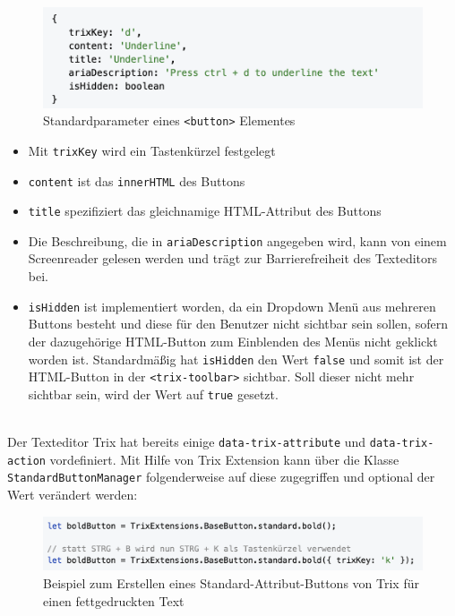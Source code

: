 \begin{figure}[H]
\begin{center}
	\includegraphics[scale=.7]{images/base-button.png}
\end{center}
	\caption{Standardparameter eines \texttt{<button>} Elementes}
\end{figure}

\begin{itemize}
	\item Mit \texttt{trixKey} wird ein Tastenkürzel festgelegt 
	\item \texttt{content} ist das \texttt{innerHTML} des Buttons
	\item \texttt{title} spezifiziert das gleichnamige HTML-Attribut des Buttons
	\item Die Beschreibung, die in \texttt{ariaDescription} angegeben wird, kann von einem Screenreader gelesen 
		werden und 
		trägt zur Barrierefreiheit des Texteditors bei.
	\item \texttt{isHidden} ist implementiert worden, da ein Dropdown Menü aus mehreren Buttons besteht und 
		diese für den Benutzer nicht sichtbar sein sollen, sofern der dazugehörige HTML-Button zum Einblenden 
		des Menüs nicht geklickt worden ist. Standardmäßig hat \texttt{isHidden} den Wert \texttt{false} und somit 
		ist der HTML-Button in der \texttt{<trix-toolbar>} sichtbar. Soll dieser nicht mehr sichtbar sein, wird der 
		Wert auf 
		\texttt{true} gesetzt.
\end{itemize}

\mbox{}\\
Der Texteditor Trix hat bereits einige \texttt{data-trix-attribute} und \texttt{data-trix-action} vordefiniert. Mit Hilfe von 
Trix Extension kann über die Klasse \texttt{StandardButtonManager} folgenderweise auf diese zugegriffen und optional 
der Wert verändert werden:

\begin{figure}[H]
\begin{center}
	\includegraphics[scale=.7]{images/standard-button.png}
\end{center}
	\caption{Beispiel zum Erstellen eines Standard-Attribut-Buttons von Trix für einen fettgedruckten Text}
\end{figure}

